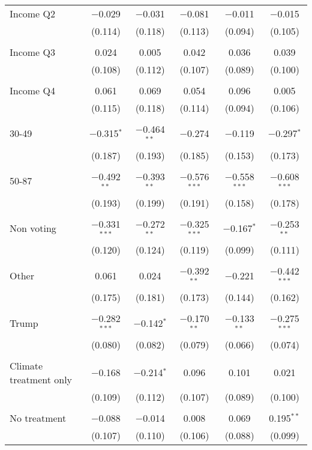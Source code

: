\begin{tabular}{@{\extracolsep{5pt}}lccccc}
 Income Q2 & $-$0.029 & $-$0.031 & $-$0.081 & $-$0.011 & $-$0.015 \\ 
  & (0.114) & (0.118) & (0.113) & (0.094) & (0.105) \\ 
  & & & & & \\ 
 Income Q3 & 0.024 & 0.005 & 0.042 & 0.036 & 0.039 \\ 
  & (0.108) & (0.112) & (0.107) & (0.089) & (0.100) \\ 
  & & & & & \\ 
 Income Q4 & 0.061 & 0.069 & 0.054 & 0.096 & 0.005 \\ 
  & (0.115) & (0.118) & (0.114) & (0.094) & (0.106) \\ 
  & & & & & \\ 
 30-49 & $-$0.315$^{*}$ & $-$0.464$^{**}$ & $-$0.274 & $-$0.119 & $-$0.297$^{*}$ \\ 
  & (0.187) & (0.193) & (0.185) & (0.153) & (0.173) \\ 
  & & & & & \\ 
 50-87 & $-$0.492$^{**}$ & $-$0.393$^{**}$ & $-$0.576$^{***}$ & $-$0.558$^{***}$ & $-$0.608$^{***}$ \\ 
  & (0.193) & (0.199) & (0.191) & (0.158) & (0.178) \\ 
  & & & & & \\ 
 Non voting & $-$0.331$^{***}$ & $-$0.272$^{**}$ & $-$0.325$^{***}$ & $-$0.167$^{*}$ & $-$0.253$^{**}$ \\ 
  & (0.120) & (0.124) & (0.119) & (0.099) & (0.111) \\ 
  & & & & & \\ 
 Other & 0.061 & 0.024 & $-$0.392$^{**}$ & $-$0.221 & $-$0.442$^{***}$ \\ 
  & (0.175) & (0.181) & (0.173) & (0.144) & (0.162) \\ 
  & & & & & \\ 
 Trump & $-$0.282$^{***}$ & $-$0.142$^{*}$ & $-$0.170$^{**}$ & $-$0.133$^{**}$ & $-$0.275$^{***}$ \\ 
  & (0.080) & (0.082) & (0.079) & (0.066) & (0.074) \\ 
  & & & & & \\ 
 Climate treatment only & $-$0.168 & $-$0.214$^{*}$ & 0.096 & 0.101 & 0.021 \\ 
  & (0.109) & (0.112) & (0.107) & (0.089) & (0.100) \\ 
  & & & & & \\ 
 No treatment & $-$0.088 & $-$0.014 & 0.008 & 0.069 & 0.195$^{**}$ \\ 
  & (0.107) & (0.110) & (0.106) & (0.088) & (0.099) \\ 

\end{tabular}
